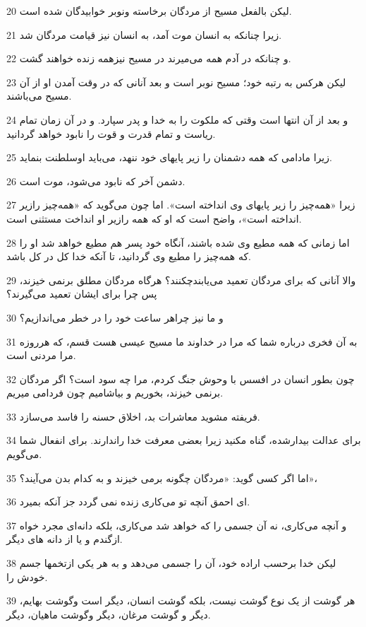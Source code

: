 \par 20 لیکن بالفعل مسیح از مردگان برخاسته ونوبر خوابیدگان شده است.
\par 21 زیرا چنانکه به انسان موت آمد، به انسان نیز قیامت مردگان شد.
\par 22 و چنانکه در آدم همه می‌میرند در مسیح نیزهمه زنده خواهند گشت.
\par 23 لیکن هرکس به رتبه خود؛ مسیح نوبر است و بعد آنانی که در وقت آمدن او از آن مسیح می‌باشند.
\par 24 و بعد از آن انتها است وقتی که ملکوت را به خدا و پدر سپارد. و در آن زمان تمام ریاست و تمام قدرت و قوت را نابود خواهد گردانید.
\par 25 زیرا مادامی که همه دشمنان را زیر پایهای خود ننهد، می‌باید اوسلطنت بنماید.
\par 26 دشمن آخر که نابود می‌شود، موت است.
\par 27 زیرا «همه‌چیز را زیر پایهای وی انداخته است». اما چون می‌گوید که «همه‌چیز رازیر انداخته است»، واضح است که او که همه رازیر او انداخت مستثنی است.
\par 28 اما زمانی که همه مطیع وی شده باشند، آنگاه خود پسر هم مطیع خواهد شد او را که همه‌چیز را مطیع وی گردانید، تا آنکه خدا کل در کل باشد.
\par 29 والا آنانی که برای مردگان تعمید می‌یابندچکنند؟ هرگاه مردگان مطلق برنمی خیزند، پس چرا برای ایشان تعمید می‌گیرند؟
\par 30 و ما نیز چراهر ساعت خود را در خطر می‌اندازیم؟
\par 31 به آن فخری درباره شما که مرا در خداوند ما مسیح عیسی هست قسم، که هرروزه مرا مردنی است.
\par 32 چون بطور انسان در افسس با وحوش جنگ کردم، مرا چه سود است؟ اگر مردگان برنمی خیزند، بخوریم و بیاشامیم چون فردامی میریم.
\par 33 فریفته مشوید معاشرات بد، اخلاق حسنه را فاسد می‌سازد.
\par 34 برای عدالت بیدارشده، گناه مکنید زیرا بعضی معرفت خدا راندارند. برای انفعال شما می‌گویم.
\par 35 اما اگر کسی گوید: «مردگان چگونه برمی خیزند و به کدام بدن می‌آیند؟»،
\par 36 ‌ای احمق آنچه تو می‌کاری زنده نمی گردد جز آنکه بمیرد.
\par 37 و آنچه می‌کاری، نه آن جسمی را که خواهد شد می‌کاری، بلکه دانه‌ای مجرد خواه ازگندم و یا از دانه های دیگر.
\par 38 لیکن خدا برحسب اراده خود، آن را جسمی می‌دهد و به هر یکی ازتخمها جسم خودش را.
\par 39 هر گوشت از یک نوع گوشت نیست، بلکه گوشت انسان، دیگر است وگوشت بهایم، دیگر و گوشت مرغان، دیگر وگوشت ماهیان، دیگر.
